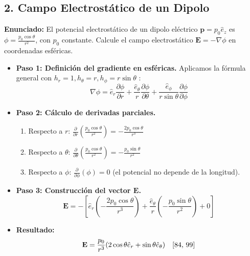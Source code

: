 \documentclass[a4paper]{article}
\begin{document}
\subsection*{2. Campo Electrostático de un Dipolo}
\textbf{Enunciado:} El potencial electrostático de un dipolo eléctrico $\mathbf{p} = p_0 \hat{e}_z$ es $\phi = \frac{p_0 \cos \theta}{r^2}$, con $p_0$ constante. Calcule el campo electrostático $\mathbf{E} = -\nabla\phi$ en coordenadas esféricas.

\begin{itemize}
    \item \textbf{Paso 1: Definición del gradiente en esféricas.} Aplicamos la fórmula general con $h_r=1, h_\theta=r, h_\phi=r \sin\theta$ \cite{82}:
    \begin{equation}
        \nabla\phi = \hat{e}_r \frac{\partial \phi}{\partial r} + \frac{\hat{e}_\theta}{r} \frac{\partial \phi}{\partial \theta} + \frac{\hat{e}_\phi}{r \sin \theta} \frac{\partial \phi}{\partial \phi}
    \end{equation}
    \item \textbf{Paso 2: Cálculo de derivadas parciales.}
    \begin{enumerate}
        \item Respecto a $r$: $\frac{\partial}{\partial r} \left( \frac{p_0 \cos\theta}{r^2} \right) = - \frac{2 p_0 \cos\theta}{r^3}$
        \item Respecto a $\theta$: $\frac{\partial}{\partial \theta} \left( \frac{p_0 \cos\theta}{r^2} \right) = - \frac{p_0 \sin\theta}{r^2}$
        \item Respecto a $\phi$: $\frac{\partial}{\partial \phi} (\phi) = 0$ (el potencial no depende de la longitud).
    \end{enumerate}
    \item \textbf{Paso 3: Construcción del vector $\mathbf{E}$.}
    \begin{equation}
        \mathbf{E} = -\left[ \hat{e}_r \left( -\frac{2 p_0 \cos\theta}{r^3} \right) + \frac{\hat{e}_\theta}{r} \left( -\frac{p_0 \sin\theta}{r^2} \right) + 0 \right]
    \end{equation}
    \item \textbf{Resultado:}
    \begin{equation}
        \mathbf{E} = \frac{p_0}{r^3} (2 \cos \theta \hat{e}_r + \sin \theta \hat{e}_\theta) \quad \text{\cite{84, 99}}
    \end{equation}
\end{itemize}
\end{document}
